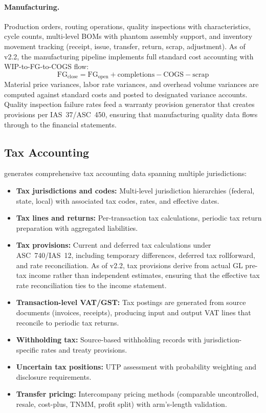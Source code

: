\paragraph{Manufacturing.}
Production orders, routing operations, quality inspections with
characteristics, cycle counts, multi-level BOMs with phantom assembly
support, and inventory movement tracking (receipt, issue, transfer,
return, scrap, adjustment).  As of v2.2, the manufacturing pipeline
implements full standard cost accounting with WIP-to-FG-to-COGS flow:
\[
\text{FG}_{\text{close}} = \text{FG}_{\text{open}} + \text{completions} - \text{COGS} - \text{scrap}
\]
Material price variances, labor rate variances, and overhead volume
variances are computed against standard costs and posted to designated
variance accounts.  Quality inspection failure rates feed a warranty
provision generator that creates provisions per IAS~37/ASC~450,
ensuring that manufacturing quality data flows through to the financial
statements.

\subsection{Tax Accounting}
\label{sec:gen_tax}

\system{} generates comprehensive tax accounting data spanning multiple
jurisdictions:

\begin{itemize}
  \item \textbf{Tax jurisdictions and codes:} Multi-level jurisdiction
    hierarchies (federal, state, local) with associated tax codes,
    rates, and effective dates.
  \item \textbf{Tax lines and returns:} Per-transaction tax calculations,
    periodic tax return preparation with aggregated liabilities.
  \item \textbf{Tax provisions:} Current and deferred tax calculations
    under ASC~740/IAS~12, including temporary differences, deferred tax
    rollforward, and rate reconciliation.  As of v2.2, tax provisions
    derive from actual GL pre-tax income rather than independent
    estimates, ensuring that the effective tax rate reconciliation ties
    to the income statement.
  \item \textbf{Transaction-level VAT/GST:} Tax postings are generated
    from source documents (invoices, receipts), producing input and
    output VAT lines that reconcile to periodic tax returns.
  \item \textbf{Withholding tax:} Source-based withholding records with
    jurisdiction-specific rates and treaty provisions.
  \item \textbf{Uncertain tax positions:} UTP assessment with probability
    weighting and disclosure requirements.
  \item \textbf{Transfer pricing:} Intercompany pricing methods
    (comparable uncontrolled, resale, cost-plus, TNMM, profit split)
    with arm's-length validation.
\end{itemize}

